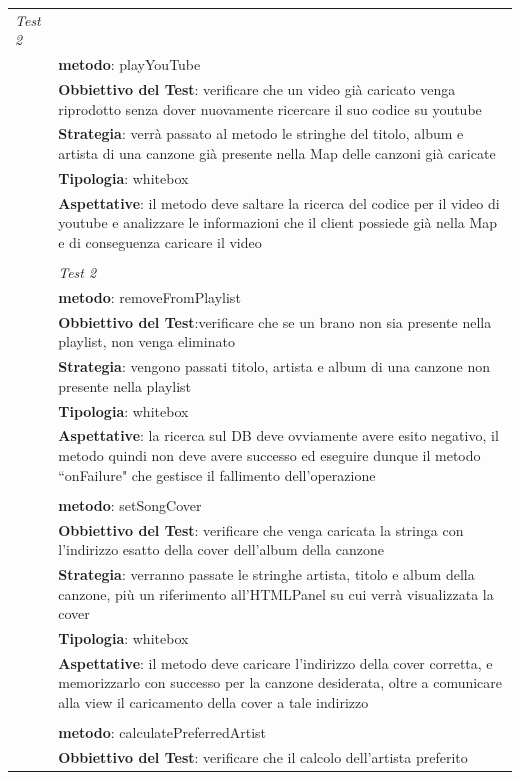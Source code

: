 \begin{footnotesize}
\begin{longtable}{|p{5.7cm}|p{10.3cm}|}
\emph{Test 2}\\&
\textbf{metodo}: playYouTube\\&
\textbf{Obbiettivo del Test}: verificare che un video gi\`a caricato venga
riprodotto senza dover nuovamente ricercare il suo codice su youtube\\&
\textbf{Strategia}: verr\`a passato al metodo le stringhe del titolo, album e
artista di una canzone gi\`a presente nella Map delle canzoni gi\`a caricate\\&
\textbf{Tipologia}: whitebox\\&
\textbf{Aspettative}: il metodo deve saltare la ricerca del codice per il
video di youtube e analizzare le informazioni che il client possiede gi\`a nella
Map e di conseguenza caricare il video\\&
\\&
\emph{Test 2}\\&
\textbf{metodo}: removeFromPlaylist\\&
\textbf{Obbiettivo del Test}:verificare che se un brano non sia presente nella
playlist, non venga eliminato\\&
\textbf{Strategia}: vengono passati titolo, artista e album di una canzone non
presente nella playlist\\&
\textbf{Tipologia}: whitebox\\&
\textbf{Aspettative}: la ricerca sul DB deve ovviamente avere esito
negativo, il metodo quindi non deve avere successo ed eseguire dunque il
metodo ``onFailure" che gestisce il fallimento dell'operazione\\&
\\&
\textbf{metodo}: setSongCover\\&
\textbf{Obbiettivo del Test}: verificare che venga caricata la stringa con
l'indirizzo esatto della cover dell'album della canzone\\&
\textbf{Strategia}: verranno passate le stringhe artista, titolo e album della
canzone, pi\`u un riferimento all'HTMLPanel su cui verr\`a visualizzata la
cover\\&
\textbf{Tipologia}: whitebox\\&
\textbf{Aspettative}: il metodo deve caricare l'indirizzo della cover
corretta, e memorizzarlo con successo per la canzone desiderata, oltre a
comunicare alla view il caricamento della cover a tale indirizzo\\&
\\&
\textbf{metodo}: calculatePreferredArtist\\&
\textbf{Obbiettivo del Test}: verificare che il calcolo dell'artista preferito

\end{longtable}
\end{footnotesize}
